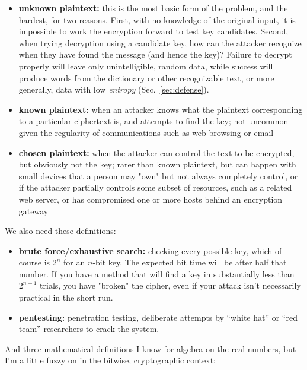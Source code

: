 \begin{itemize}
\item {\bf unknown plaintext:} this is the most basic form of the
  problem, and the hardest, for two reasons.  First, with no knowledge
  of the original input, it is impossible to work the encryption
  forward to test key candidates.  Second, when trying decryption
  using a candidate key, how can the attacker recognize when they have
  found the message (and hence the key)?  Failure to decrypt properly
  will leave only unintelligible, random data, while success will
  produce words from the dictionary or other recognizable text, or
  more generally, data with low \emph{entropy} (Sec.~\ref{sec:defense}).
\item {\bf known plaintext:} when an attacker knows what the plaintext
  corresponding to a particular ciphertext is, and attempts to find
  the key; not uncommon given the regularity of communications such as
  web browsing or email
\item {\bf chosen plaintext:} when the attacker can control the text to be
  encrypted, but obviously not the key; rarer than known plaintext,
  but can happen with small devices that a person may "own" but not
  always completely control, or if the attacker partially controls
  some subset of resources, such as a related web server, or has
  compromised one or more hosts behind an encryption gateway
\end{itemize}

We also need these definitions:

\begin{itemize}
\item {\bf brute force/exhaustive search:} checking every possible key, which of
  course is $2^n$ for an $n$-bit key.  The expected hit time will be
  after half that number.  If you have a method that will find a
  key in substantially less than $2^{n-1}$ trials, you have "broken" the
  cipher, even if your attack isn't necessarily practical in the short
  run.
\item {\bf pentesting:} penetration testing, deliberate attempts by
  ``white hat'' or ``red team'' researchers to crack the system.
\end{itemize}

\aono{}
And three mathematical definitions I know for algebra on the real
numbers, but I'm a little fuzzy on in the bitwise, cryptographic
context:

